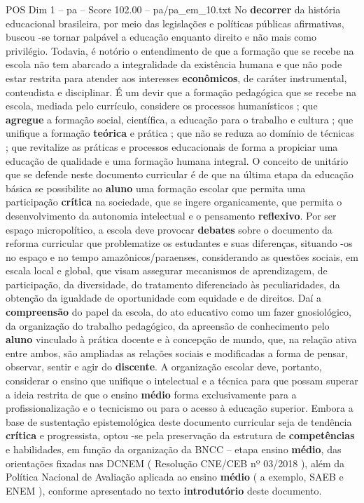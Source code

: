 \begin{textsample}{POS Dim 1 – pa – Score 102.00 – pa/pa\_em\_10.txt}
No \textbf{decorrer} da história educacional brasileira, por meio das legislações e políticas públicas afirmativas, buscou -se tornar palpável a educação enquanto direito e não mais como privilégio.
Todavia, é notório o entendimento de que a formação que se recebe na escola não tem abarcado a integralidade da existência humana e que não pode estar restrita para atender aos interesses \textbf{econômicos}, de caráter instrumental, conteudista e disciplinar.
É um devir que a formação pedagógica que se recebe na escola, mediada pelo currículo, considere os processos humanísticos ; que \textbf{agregue} a formação social, científica, a educação para o trabalho e cultura ; que unifique a formação \textbf{teórica} e prática ; que não se reduza ao domínio de técnicas ; que revitalize as práticas e processos educacionais de forma a propiciar uma educação de qualidade e uma formação humana integral.
O conceito de unitário que se defende neste documento curricular é de que na última etapa da educação básica se possibilite ao \textbf{aluno} uma formação escolar que permita uma participação \textbf{crítica} na sociedade, que se ingere organicamente, que permita o desenvolvimento da autonomia intelectual e o pensamento \textbf{reflexivo}.
Por ser espaço micropolítico, a escola deve provocar \textbf{debates} sobre o documento da reforma curricular que problematize os estudantes e suas diferenças, situando -os no espaço e no tempo amazônicos/paraenses, considerando as questões sociais, em escala local e global, que visam assegurar mecanismos de aprendizagem, de participação, da diversidade, do tratamento diferenciado às peculiaridades, da obtenção da igualdade de oportunidade com equidade e de direitos.
Daí a \textbf{compreensão} do papel da escola, do ato educativo como um fazer gnosiológico, da organização do trabalho pedagógico, da apreensão de conhecimento pelo \textbf{aluno} vinculado à prática docente e à concepção de mundo, que, na relação ativa entre ambos, são ampliadas as relações sociais e modificadas a forma de pensar, observar, sentir e agir do \textbf{discente}.
A organização escolar deve, portanto, considerar o ensino que unifique o intelectual e a técnica para que possam superar a ideia restrita de que o ensino \textbf{médio} forma exclusivamente para a profissionalização e o tecnicismo ou para o acesso à educação superior.
Embora a base de sustentação epistemológica deste documento curricular seja de tendência \textbf{crítica} e progressista, optou -se pela preservação da estrutura de \textbf{competências} e habilidades, em função da organização da BNCC – etapa ensino \textbf{médio}, das orientações fixadas nas DCNEM ( Resolução CNE/CEB nº 03/2018 ), além da Política Nacional de Avaliação aplicada ao ensino \textbf{médio} ( a exemplo, SAEB e ENEM ), conforme apresentado no texto \textbf{introdutório} deste documento.

\end{textsample}
